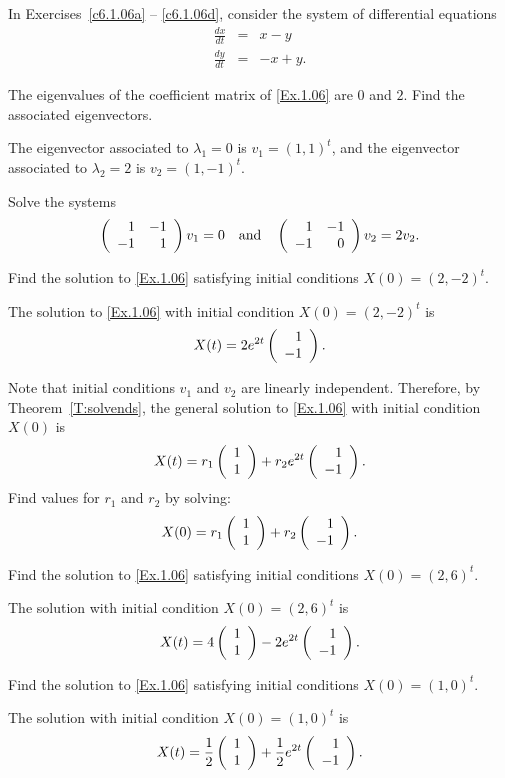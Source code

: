 \documentclass{ximera}
\begin{document}
\noindent In Exercises~\ref{c6.1.06a} -- \ref{c6.1.06d}, consider the system of
differential equations
\begin{equation} \label{Ex.1.06}
\begin{array}{rcr}
\frac{dx}{dt}  & = & x-y \\
\frac{dy}{dt}  & = & -x+y.
\end{array}
\end{equation}
\begin{exercise} \label{c6.1.06a}
The eigenvalues of the coefficient matrix of \eqref{Ex.1.06} are $0$ and $2$.
Find the associated eigenvectors.

\begin{solution}

\ans The eigenvector associated to $\lambda_1 = 0$ is $v_1 = (1,1)^t$,
and the eigenvector associated to $\lambda_2 = 2$ is $v_2 = (1,-1)^t$.

\soln Solve the systems
\[
\left(\begin{array}{rr} 1 & -1\\ -1 &1\end{array}\right)v_1 = 0 \quad\mbox{and}\quad \left(\begin{array}{rr} 1 & -1\\ -1 &0\end{array}\right)v_2 = 2v_2.
\]

\end{solution}
\end{exercise}
\begin{exercise} \label{c6.1.06b}
Find the solution to \eqref{Ex.1.06} satisfying initial conditions
$X(0)=(2,-2)^t$.

\begin{solution}
\ans The solution to \eqref{Ex.1.06} with initial condition
$X(0) = (2,-2)^t$ is 
\[
X(t) = 2e^{2t}\left(\begin{array}{r} 1 \\ -1\end{array}\right).
\]

\soln Note that initial conditions $v_1$ and $v_2$ are linearly
independent.  Therefore, by Theorem~\ref{T:solvends}, the general solution
to \eqref{Ex.1.06} with initial condition $X(0)$ is
\[
X(t) = r_1\left(\begin{array}{r} 1 \\ 1\end{array}\right) + r_2e^{2t}\left(\begin{array}{r} 1 \\ -1\end{array}\right).
\]
Find values for $r_1$ and $r_2$ by solving:
\begin{equation} \label{c6.1.06eq}
X(0) = r_1\left(\begin{array}{r} 1 \\ 1\end{array}\right) + r_2\left(\begin{array}{r} 1 \\ -1\end{array}\right).
\end{equation}

\end{solution}
\end{exercise}
\begin{exercise} \label{c6.1.06c}
Find the solution to \eqref{Ex.1.06} satisfying initial conditions
$X(0)=(2,6)^t$.

\begin{solution}
The solution with initial condition $X(0) = (2,6)^t$ is 
\[
X(t) = 4\left(\begin{array}{r} 1 \\ 1\end{array}\right) - 2e^{2t}\left(\begin{array}{r} 1 \\ -1\end{array}\right).
\]


\end{solution}
\end{exercise}
\begin{exercise} \label{c6.1.06d}
Find the solution to \eqref{Ex.1.06} satisfying initial conditions
$X(0)=(1,0)^t$.

\begin{solution}
The solution with initial condition $X(0) = (1,0)^t$ is
\[
X(t) = \frac{1}{2}\left(\begin{array}{r} 1 \\ 1\end{array}\right) + \frac{1}{2}e^{2t}\left(\begin{array}{r} 1 \\ -1\end{array}\right).
\]


\end{solution}
\end{exercise}
\end{document}
